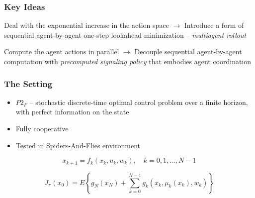 \documentclass{beamer}
\begin{document}
    \begin{frame}
	\frametitle{Key Ideas}
	
	
        \begin{block}{Deal with the exponential increase in the action space}
	$\rightarrow$ Introduce a form of sequential
	agent-by-agent one-step lookahead minimization --
	\textit{multiagent rollout}
	
\end{block}

\begin{block}{Compute the agent actions in parallel}
	$\rightarrow$ Decouple sequential 
	agent-by-agent computation with \textit{precomputed
		signaling policy} that embodies agent coordination
\end{block}	
	
	

	\end{frame}





    \begin{frame}
        \frametitle{The Setting}
        
        \begin{itemize}
			\item $P2_F$ -- stochastic discrete-time optimal control problem over a finite horizon, with perfect information on the state
			\item Fully cooperative
			\item Tested in Spiders-And-Flies environment
		\end{itemize}
	
	$$x_{k+1}=f_{k}\left(x_{k}, u_{k}, w_{k}\right), \quad k=0,1, \ldots, N-1$$
	
	$$J_{\pi}\left(x_{0}\right)=E\left\{g_{N}\left(x_{N}\right)+\sum_{k=0}^{N-1} g_{k}\left(x_{k}, \mu_{k}\left(x_{k}\right), w_{k}\right)\right\}$$
	
	
    \end{frame}


\end{document}

